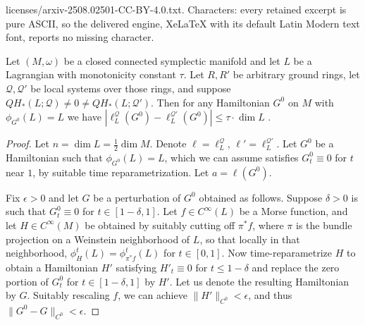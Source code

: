 \documentclass[10pt,a4paper]{amsart}
\newcommand{\cQ}{{\mathcal{Q}}}
\begin{document}
licenses/arxiv-2508.02501-CC-BY-4.0.txt. Characters: every retained excerpt is pure ASCII, so the delivered engine, XeLaTeX with its default Latin Modern text font, reports no missing character.
\begin{lemma}\label{lem:boundedness_Lag_sp_invt}Let $(M,\omega)$ be a closed connected symplectic manifold and let $L$ be a Lagrangian with monotonicity constant $\tau$. Let $R,R'$ be arbitrary ground rings, let $\cQ,\cQ'$ be local systems over those rings, and suppose $QH_*(L;\cQ)\neq 0\neq QH_*(L;\cQ')$. Then  for any Hamiltonian $G^0$ on $M$ with $\phi_{G^0}(L)=L$ we have $|\ell_L^{\cQ}(G^0)-\ell_L^{\cQ'}(G^0)|\leq \tau\cdot\dim L$ .
\end{lemma}

\begin{proof}
  Let $n=\dim L = \frac 12 \dim M$. Denote $\ell=\ell^\cQ_L$, $\ell'=\ell^{\cQ'}_L$. Let $G^0$ be a Hamiltonian such that $\phi_{G^0}(L) = L$, which we can assume satisfies $G^0_t\equiv 0$ for $t$ near $1$, by suitable time reparametrization. Let $a = \ell(G^0)$.

  Fix $\epsilon > 0$ and let $G$ be a perturbation of $G^0$ obtained as follows. Suppose $\delta > 0$ is such that $G^0_t\equiv 0$ for $t\in[1-\delta,1]$. Let $f \in C^\infty(L)$ be a Morse function, and let $H \in C^\infty(M)$ be obtained by suitably cutting off $\pi^*f$, where $\pi$ is the bundle projection on a Weinstein neighborhood of $L$, so that locally in that neighborhood, $\phi^t_H(L) = \phi_{\pi^*f}^t(L)$ for $t \in [0,1]$. Now time-reparametrize $H$ to obtain a Hamiltonian $H'$ satisfying $H'_t\equiv 0$ for $t \leq 1-\delta$ and replace the zero portion of $G^0_t$ for $t \in [1-\delta,1]$ by $H'$. Let us denote the resulting Hamiltonian by $G$. Suitably rescaling $f$, we can achieve $\|H'\|_{C^0} < \epsilon$, and thus $\|G^0-G\|_{C^0} < \epsilon$.


\end{proof}
\end{document}
